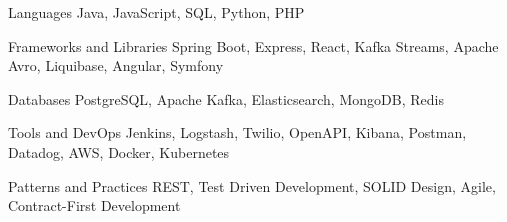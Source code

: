 
\begin{cvskills}

  \cvskill
    {Languages} %
    {Java, JavaScript, SQL, Python, PHP} %

  \cvskill
    {Frameworks and Libraries} %
    {Spring Boot, Express, React, Kafka Streams, Apache Avro, Liquibase,
    Angular, Symfony} %

  \cvskill
    {Databases} %
    {PostgreSQL, Apache Kafka, Elasticsearch, MongoDB, Redis} %

  \cvskill
    {Tools and DevOps} %
    {Jenkins, Logstash, Twilio, OpenAPI, Kibana, Postman, Datadog, AWS, Docker,
    Kubernetes} %

  \cvskill
    {Patterns and Practices} %
    {REST, Test Driven Development, SOLID Design, Agile, Contract-First
    Development} %
\end{cvskills}
